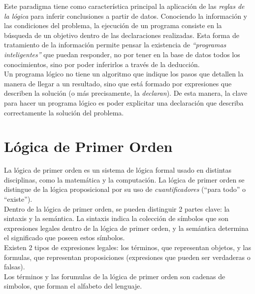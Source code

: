 \documentclass[12pt,titlepage]{report}
\begin{document}
Este paradigma tiene como característica principal la aplicación de las \emph{reglas de la lógica} para inferir conclusiones a partir de datos. Conociendo la información y las condiciones del problema, la ejecución de un programa consiste en la búsqueda de un objetivo dentro de las declaraciones realizadas. Esta forma de tratamiento de la información permite pensar la existencia de \emph{``programas inteligentes''} que puedan responder, no por tener en la base de datos todos los conocimientos, sino por poder inferirlos a través de la deducción.  \\

Un programa lógico no tiene un algoritmo que indique los pasos que detallen la manera de llegar a un resultado, sino que está formado por expresiones que describen la solución (o más precisamente, la \emph{declaran}). De esta manera, la clave para hacer un programa lógico es poder explicitar una declaración que describa correctamente la solución del problema. \\

\section{Lógica de Primer Orden}

La lógica de primer orden es un sistema de lógica formal usado en distintas disciplinas, como la matemática y la computación. La lógica de primer orden se distingue de la lógica proposicional por su uso de \emph{cuantificadores} (``para todo'' o ``existe''). \\

Dentro de la lógica de primer orden, se pueden distinguir 2 partes clave: la sintaxis y la semántica. La sintaxis indica la colección de símbolos que son expresiones legales dentro de la lógica de primer orden, y la semántica determina el significado que poseen estos símbolos. \\

Existen 2 tipos de expresiones legales: los términos, que representan objetos, y las formulas, que representan proposiciones (expresiones que pueden ser verdaderas o falsas). \\

Los términos y las forumulas de la lógica de primer orden son cadenas de simbolos, que forman el alfabeto del lenguaje. \\
\end{document}
